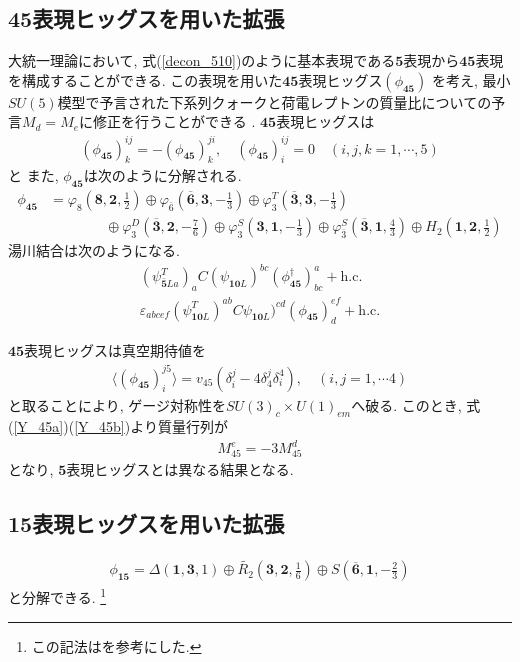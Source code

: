 \subsection{45表現ヒッグスを用いた拡張}
大統一理論において, 式(\ref{decon_510})のように基本表現である$\bm{5}$表現から$\bm{45}$表現を構成することができる.
この表現を用いた$\bm{45}$表現ヒッグス$(\phi_{\bm{45}})$ を考え, 
最小$SU(5)$模型で予言された下系列クォークと荷電レプトンの質量比についての予言$M_d = M_e$に修正を行うことができる
\cite{framptonEstimateFlavorNumber1979,georgiNewLeptonquarkMass1979}.
$\bm{45}$表現ヒッグスは
\begin{align}
  \left(\phi_{\bm{45}}\right)^{ij}_k = -(\phi_{\bm{45}})^{ji}_k,\quad (\phi_{\bm{45}})^{ij}_i =0 \quad(i,j,k =1,\cdots,5)\nonumber
\end{align}
と
また, $\phi_{\bm{45}}$は次のように分解される.
\begin{align}
  \phi_{\bm{45}} &= \varphi_8 \left(\bm{8}, \bm{2}, \frac{1}{2}\right) \oplus \varphi_{\bar{6}}\left(\overline{\bm{6}}, \bm{3}, -\frac{1}{3}\right) \oplus \varphi_3^T\left(\overline{\bm{3}}, \bm{3}, -\frac{1}{3}\right) \nonumber\\
                 &\qquad\qquad\oplus \varphi_3^D\left( \overline{\bm{3}}, \bm{2}, -\frac{7}{6}\right) \oplus \varphi_3^S\left(\bm{3}, \bm{1}, -\frac{1}{3}\right)\oplus \varphi_{\overline{3}}^S\left( \overline{\bm{3}}, \bm{1}, \frac{4}{3}\right)\oplus H_2\left(\bm{1}, \bm{2}, \frac{1}{2}\right)\nonumber
\end{align}
湯川結合は次のようになる.
\begin{align}
  (\psi_{\bm{\bar{5}}La}^T)_a C (\psi_{\bm{10}L})^{bc} (\phi_{\bm{45}}^\dagger)_{bc}^a+\mathrm{h.c.}\label{Y_45a}\\
  \varepsilon_{abcef} (\psi_{\bm{10}L}^T)^{ab} C \psi_{\bm{10}L})^{cd} (\phi_{\bm{45}})_d^{ef}+ \mathrm{h.c.}\label{Y_45b}
\end{align}

$\bm{45}$表現ヒッグスは真空期待値を
\begin{align}
  \langle (\phi_{\bm{45}})^{j5}_i\rangle = v_{45}\left(\delta^j_i - 4\delta^j_4 \delta_i^4\right),\quad(i,j=1,\cdots 4)
\end{align}
と取ることにより, ゲージ対称性を$SU(3)_c\times U(1)_{em}$へ破る.
このとき, 式(\ref{Y_45a})(\ref{Y_45b})より質量行列が
\begin{align}
  M^e_{45} = -3M_{45}^d
\end{align}
となり, $\bm{5}$表現ヒッグスとは異なる結果となる.

\subsection{15表現ヒッグスを用いた拡張}
\begin{align}
  \phi_{\bm{15}} = \Delta \left(\bm{1}, \bm{3}, 1\right) \oplus \widetilde{R_2}\left(\bm{3}, \bm{2},\frac{1}{6}\right)\oplus S\left(\overline{\bm{6}}, \bm{1}, -\frac{2}{3}\right)
\end{align}
と分解できる.
\footnote{
  この記法は\cite{dorsnerPhysicsLeptoquarksPrecision2016}を参考にした.
}

